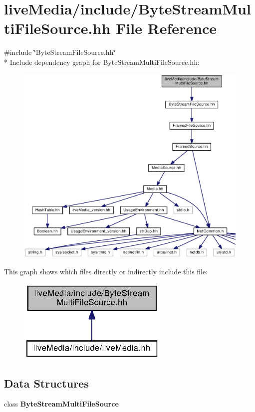 \section{live\+Media/include/\+Byte\+Stream\+Multi\+File\+Source.hh File Reference}
\label{ByteStreamMultiFileSource_8hh}
{\ttfamily \#include \char`\"{}Byte\+Stream\+File\+Source.\+hh\char`\"{}}\\*
Include dependency graph for Byte\+Stream\+Multi\+File\+Source.\+hh\+:
\nopagebreak
\begin{figure}[H]
\begin{center}
\leavevmode
\includegraphics[width=350pt]{ByteStreamMultiFileSource_8hh__incl}
\end{center}
\end{figure}
This graph shows which files directly or indirectly include this file\+:
\nopagebreak
\begin{figure}[H]
\begin{center}
\leavevmode
\includegraphics[width=204pt]{ByteStreamMultiFileSource_8hh__dep__incl}
\end{center}
\end{figure}
\subsection*{Data Structures}
\begin{DoxyCompactItemize}
\item 
class {\bf Byte\+Stream\+Multi\+File\+Source}
\end{DoxyCompactItemize}
